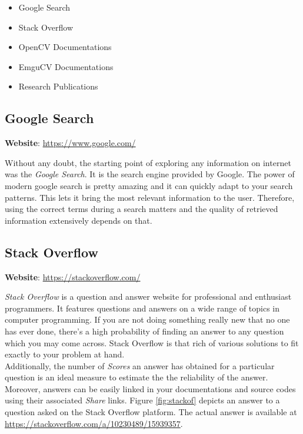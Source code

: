 \documentclass[a4paper,12pt]{report}
\begin{document}
\begin{itemize}
	\item Google Search 
	\item Stack Overflow 
	\item OpenCV Documentations 
	\item EmguCV Documentations 
	\item Research Publications
\end{itemize}

\subsection{Google Search}

\textbf{Website}: \url{https://www.google.com/}

Without any doubt, the starting point of exploring any information on internet was the \textit{Google Search}.  It is the search engine provided by Google. The power of modern google search is pretty amazing and it can quickly adapt to your search patterns. This lets it bring the most relevant information to the user. Therefore, using the correct terms during a search matters and the quality of retrieved information extensively depends on that.

\subsection{Stack Overflow}

\textbf{Website}: \url{https://stackoverflow.com/}

\textit{Stack Overflow} is a question and answer website for professional and enthusiast programmers. It features questions and answers on a wide range of topics in computer programming\cite{stackoverflow}. If you are not doing something really new that no one has ever done, there's a high probability of finding an answer to any question which you may come across. Stack Overflow is that rich of various solutions to fit exactly to your problem at hand.\\

Additionally, the number of \textit{Scores} an answer has obtained for a particular question is an ideal measure to estimate the the reliability of the answer. Moreover, answers can be easily linked in your documentations and source codes using their associated \textit{Share} links. Figure \ref{fig:stackof} depicts an answer to a question asked on the Stack Overflow platform. The actual answer is available at \url{https://stackoverflow.com/a/10230489/15939357}.
\end{document}

